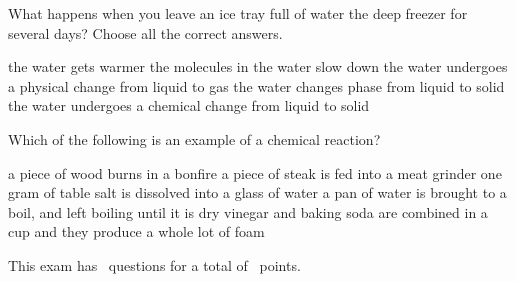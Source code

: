 \documentclass[11pt,addpoints]{exam}   	%
\begin{document}
\begin{questions}
\begin{parts}
\vspace{3in}

\end{parts}

\question[5]
What happens when you leave an ice tray full of water the deep freezer for several days?
Choose all the correct answers.

\begin{choices}
\choice the water gets warmer
\choice the molecules in the water slow down
\choice the water undergoes a physical change from liquid to gas
\choice the water changes phase from liquid to solid
\choice the water undergoes a chemical change from liquid to solid
\end{choices}

\question[5]
Which of the following is an example of a chemical reaction?

\begin{choices}
\choice a piece of wood burns in a bonfire
\choice a piece of steak is fed into a meat grinder
\choice one gram of table salt is dissolved into a glass of water
\choice a pan of water is brought to a boil, and left boiling until it is dry
\choice vinegar and baking soda are combined in a cup and they produce a whole lot of foam
\end{choices}

\end{questions}

\begin{center}
This exam has \numquestions\ questions for a total of \numpoints\ points.
\end{center}
\end{document}
